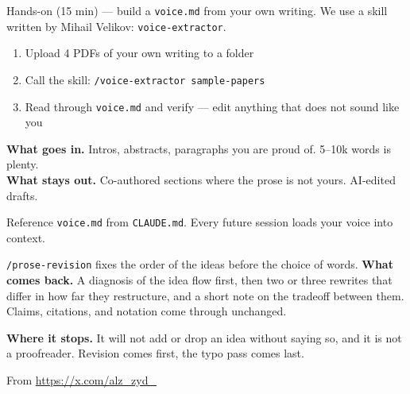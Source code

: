 \documentclass[aspectratio=169, 10pt]{beamer}
\begin{document}
\begin{frame}[fragile]{Hands-on (15 min) --- build a \texttt{voice.md} from your own writing.}
\vskip0.2cm
We use a skill written by Mihail Velikov: \texttt{voice-extractor}.

\vskip0.3cm
\begin{enumerate}
  \item Upload 4 PDFs of your own writing to a folder
  \item Call the skill: \texttt{/voice-extractor sample-papers}
  \item Read through \texttt{voice.md} and verify --- edit anything that does not sound like you
\end{enumerate}

\vskip0.4cm
\textbf{What goes in.} Intros, abstracts, paragraphs you are proud of. 5--10k words is plenty.\\
\textbf{What stays out.} Co-authored sections where the prose is not yours. AI-edited drafts.

\vskip0.3cm
\begin{sowhat}
Reference \texttt{voice.md} from \texttt{CLAUDE.md}. Every future session loads your voice into context.
\end{sowhat}
\end{frame}

\begin{frame}{\texttt{/prose-revision} fixes the order of the ideas before the choice of words.}
\vskip0.25cm
\textbf{What comes back.} A diagnosis of the idea flow first, then two or three rewrites that differ in how far they restructure, and a short note on the tradeoff between them. Claims, citations, and notation come through unchanged.

\vskip0.25cm
\textbf{Where it stops.} It will not add or drop an idea without saying so, and it is not a proofreader. Revision comes first, the typo pass comes last.

\vskip0.25cm
{\footnotesize From \url{https://x.com/alz_zyd_}}
\end{frame}


\end{document}
